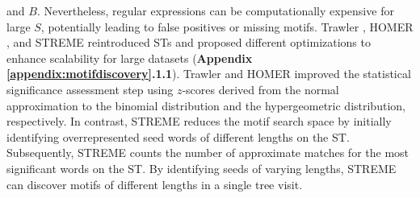 \documentclass[a4paper, titlepage, openright]{book}
\begin{document}
and $B$. Nevertheless, regular expressions can be computationally expensive for large $S$, potentially leading to false positives or missing motifs. Trawler \citep{ettwiller2007trawler}, HOMER \citep{heinz2010simple}, and STREME \citep{bailey2021streme} reintroduced STs and proposed different optimizations to enhance scalability for large datasets (\textbf{Appendix \ref{appendix:motifdiscovery}.1.1}). Trawler and HOMER improved the statistical significance assessment step using $z$-scores derived from the normal approximation to the binomial distribution and the hypergeometric distribution, respectively. In contrast, STREME reduces the motif search space by initially identifying overrepresented seed words of different lengths on the ST. Subsequently, STREME counts the number of approximate matches for the most significant words on the ST. By identifying seeds of varying lengths, STREME can discover motifs of different lengths in a single tree visit.

\end{document}

